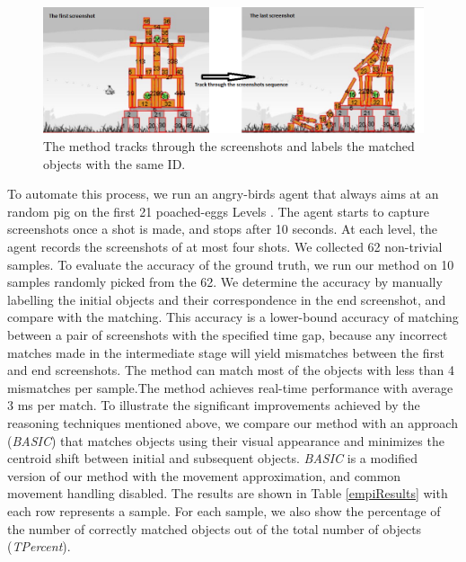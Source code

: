 \documentclass[letterpaper]{article}
\begin{document}
\begin{figure}[b!]
\centering\includegraphics[scale=0.32]{TrackingBackup.png}\caption{The method tracks through the screenshots and labels the matched objects with the same ID.} %
\label{Tracking}
\vspace{-4mm}
\end{figure}

To automate this process, we run an angry-birds agent that always aims at an random pig on the first 21 poached-eggs Levels \cite{abGame}. The agent starts to capture screenshots once a shot is made, and stops after 10 seconds. At each level, the agent records the screenshots of at most four shots. We collected 62 non-trivial samples. To evaluate the accuracy of the ground truth, we run our method on 10 samples randomly picked from the 62. We determine the accuracy by manually labelling the initial objects and their correspondence in the end screenshot, and compare with the matching. This accuracy is a lower-bound accuracy of matching between a pair of screenshots with the specified time gap, because any incorrect matches made in the intermediate stage will yield mismatches between the first and end screenshots.  
The method can match most of the objects with less than 4 mismatches per sample.The method achieves real-time performance with average 3 ms per match. To illustrate the significant improvements achieved by the reasoning techniques mentioned above, we compare our method with an approach (\emph{BASIC}) that matches objects using their visual appearance and minimizes the centroid shift between initial and subsequent objects. \emph{BASIC} is a modified version of our method with the movement approximation, and common movement handling disabled. The results are shown in Table \ref{empiResults} with each row represents a sample. For each sample, we also show the percentage of the number of correctly matched objects out of the total number of objects (\emph{TPercent}).
\end{document}
